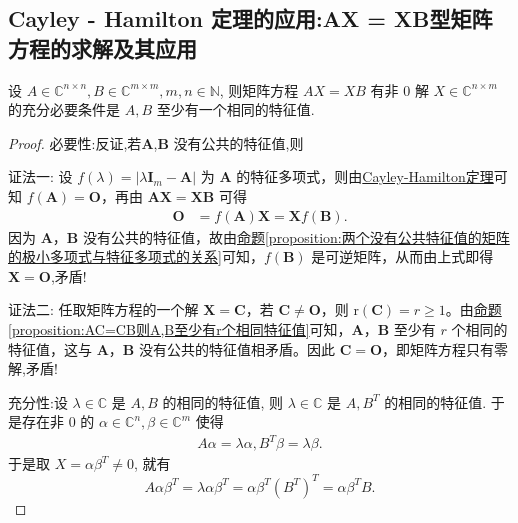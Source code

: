 \documentclass[../../main.tex]{subfiles}%
\begin{document}
\subsection{Cayley - Hamilton 定理的应用:AX = XB型矩阵方程的求解及其应用}

\begin{proposition}[$AX=XB$经典结论]\label{AX=XB相关命题1}
设 $A \in \mathbb{C}^{n \times n}, B \in \mathbb{C}^{m \times m}, m, n \in \mathbb{N}$, 则矩阵方程 $AX=XB$ 有非 $0$ 解 $X \in \mathbb{C}^{n \times m}$ 的充分必要条件是 $A, B$ 至少有一个相同的特征值.
\end{proposition}
\begin{proof}

{\heiti 必要性:}反证,若\(\boldsymbol{A}\),\(\boldsymbol{B}\) 没有公共的特征值,则

{\color{blue}证法一:}
设 \(f(\lambda)=|\lambda\boldsymbol{I}_m - \boldsymbol{A}|\) 为 \(\boldsymbol{A}\) 的特征多项式，则由\hyperref[theorem:Cayley-Hamilton定理]{Cayley-Hamilton定理}可知 \(f(\boldsymbol{A})=\boldsymbol{O}\)，再由 \(\boldsymbol{AX = XB}\) 可得
\begin{align*}
\boldsymbol{O}&=f(\boldsymbol{A})\boldsymbol{X}=\boldsymbol{X}f(\boldsymbol{B}).
\end{align*}
因为 \(\boldsymbol{A}\)，\(\boldsymbol{B}\) 没有公共的特征值，故由\hyperref[proposition:两个没有公共特征值的矩阵的极小多项式与特征多项式的关系]{命题\ref{proposition:两个没有公共特征值的矩阵的极小多项式与特征多项式的关系}}可知，\(f(\boldsymbol{B})\) 是可逆矩阵，从而由上式即得 \(\boldsymbol{X = O}\),矛盾!

{\color{blue}证法二:}
任取矩阵方程的一个解 \(\boldsymbol{X = C}\)，若 \(\boldsymbol{C\neq O}\)，则 \(\mathrm{r}(\boldsymbol{C}) = r\geqslant  1\)。由\hyperref[proposition:AC=CB则A,B至少有r个相同特征值]{命题\ref{proposition:AC=CB则A,B至少有r个相同特征值}}可知，\(\boldsymbol{A}\)，\(\boldsymbol{B}\) 至少有 \(r\) 个相同的特征值，这与 \(\boldsymbol{A}\)，\(\boldsymbol{B}\) 没有公共的特征值相矛盾。因此 \(\boldsymbol{C = O}\)，即矩阵方程只有零解,矛盾!

{\heiti 充分性:}设 $\lambda \in \mathbb{C}$ 是 $A, B$ 的相同的特征值, 则 $\lambda \in \mathbb{C}$ 是 $A, B^T$ 的相同的特征值. 于是存在非 $0$ 的 $\alpha \in \mathbb{C}^n, \beta \in \mathbb{C}^m$ 使得
\begin{align*}
A\alpha = \lambda\alpha, B^T\beta = \lambda\beta.
\end{align*}
于是取 $X = \alpha\beta^T \neq 0$, 就有
$$A\alpha\beta^T = \lambda\alpha\beta^T = \alpha\beta^T (B^T)^T = \alpha\beta^T B.$$

\end{proof}
\end{document}

